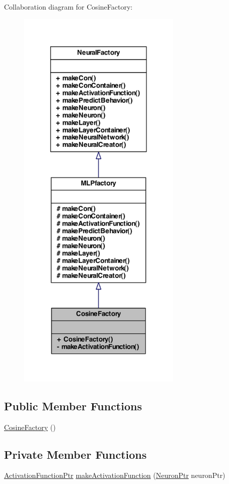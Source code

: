 Collaboration diagram for CosineFactory:\nopagebreak
\begin{figure}[H]
\begin{center}
\leavevmode
\includegraphics[width=222pt]{class_cosine_factory__coll__graph}
\end{center}
\end{figure}
\subsection*{Public Member Functions}
\begin{DoxyCompactItemize}
\item 
\hyperlink{class_cosine_factory_ab0e1416246babfea24ededf7ee0dafc9}{CosineFactory} ()
\end{DoxyCompactItemize}
\subsection*{Private Member Functions}
\begin{DoxyCompactItemize}
\item 
\hyperlink{_a_m_o_r_e_8h_a77602a0277a02e5769c3df0adc669b17}{ActivationFunctionPtr} \hyperlink{class_cosine_factory_a7db770cbd419032850a7e4f09b0836cc}{makeActivationFunction} (\hyperlink{_a_m_o_r_e_8h_ac1ea936c2c7728eb382278131652fef4}{NeuronPtr} neuronPtr)
\end{DoxyCompactItemize}


